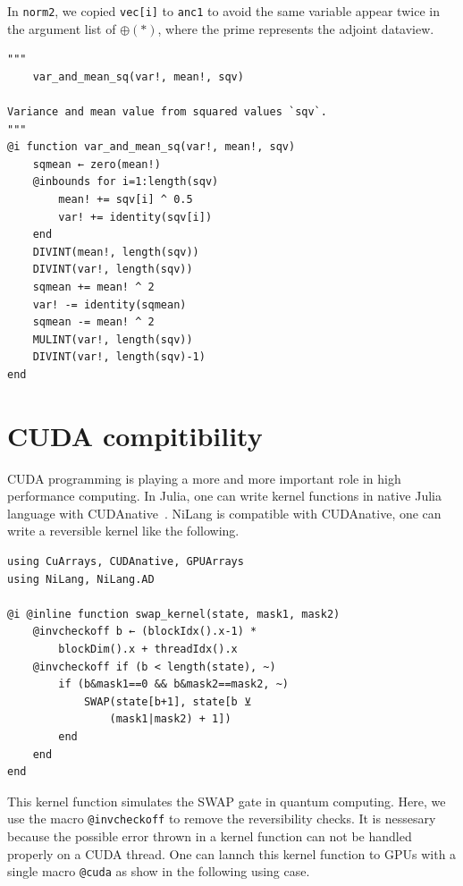 \documentclass[aps,twocolumn,longbibliography,english,superscriptaddress]{revtex4-1}
\newcommand{\<}{\langle}
\renewcommand{\>}{\rangle}
\theoremstyle{definition}\newtheorem{definition}{\textit{Definition}}
\begin{document}
In \texttt{norm2}, we copied \texttt{vec[i]\textquotesingle} to \texttt{anc1} to avoid the same variable appear twice in the argument list of $\oplus(*)$, where the prime represents the adjoint dataview.

\begin{minipage}{.44\textwidth}
\begin{lstlisting}
"""
    var_and_mean_sq(var!, mean!, sqv)

Variance and mean value from squared values `sqv`.
"""
@i function var_and_mean_sq(var!, mean!, sqv)
    sqmean ← zero(mean!)
    @inbounds for i=1:length(sqv)
        mean! += sqv[i] ^ 0.5
        var! += identity(sqv[i])
    end
    DIVINT(mean!, length(sqv))
    DIVINT(var!, length(sqv))
    sqmean += mean! ^ 2
    var! -= identity(sqmean)
    sqmean -= mean! ^ 2
    MULINT(var!, length(sqv))
    DIVINT(var!, length(sqv)-1)
end
\end{lstlisting}
\end{minipage}

\section{CUDA compitibility}\label{app:cuda}
CUDA programming is playing a more and more important role in high performance computing. In Julia, one can write kernel functions in native Julia language with CUDAnative~\cite{Besard2018}.
NiLang is compatible with CUDAnative, one can write a reversible kernel like the following.

\begin{minipage}{.44\textwidth}
\begin{lstlisting}
using CuArrays, CUDAnative, GPUArrays
using NiLang, NiLang.AD

@i @inline function swap_kernel(state, mask1, mask2)
    @invcheckoff b ← (blockIdx().x-1) * 
        blockDim().x + threadIdx().x
    @invcheckoff if (b < length(state), ~)
        if (b&mask1==0 && b&mask2==mask2, ~)
            SWAP(state[b+1], state[b ⊻ 
                (mask1|mask2) + 1])
        end
    end
end
\end{lstlisting}
\end{minipage}

This kernel function simulates the SWAP gate in quantum computing.
Here, we use the macro \texttt{@invcheckoff} to remove the reversibility checks.
It is nessesary because the possible error thrown in a kernel function can not be handled properly on a CUDA thread.
One can lannch this kernel function to GPUs with a single macro \texttt{@cuda} as show in the following using case.
\end{document}

